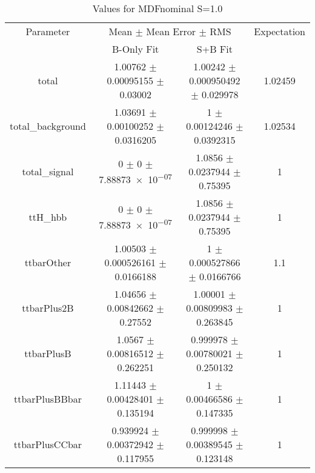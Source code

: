 \begin{table}
\centering
\caption{Values for MDFnominal S=1.0}
\begin{tabular}{cccc}
\toprule
Parameter & \multicolumn{2}{c}{Mean $\pm$ Mean Error $\pm$ RMS} & Expectation\\
 & B-Only Fit & S+B Fit & \\
\midrule
total & \num{1.00762} $\pm$ \num{0.00095155} $\pm$ \num{0.03002} & \num{1.00242} $\pm$ \num{0.000950492} $\pm$ \num{0.029978} & \num{1.02459}\\
total\_background & \num{1.03691} $\pm$ \num{0.00100252} $\pm$ \num{0.0316205} & \num{1} $\pm$ \num{0.00124246} $\pm$ \num{0.0392315} & \num{1.02534}\\
total\_signal & \num{0} $\pm$ \num{0} $\pm$ \num{7.88873e-07} & \num{1.0856} $\pm$ \num{0.0237944} $\pm$ \num{0.75395} & \num{1}\\
ttH\_hbb & \num{0} $\pm$ \num{0} $\pm$ \num{7.88873e-07} & \num{1.0856} $\pm$ \num{0.0237944} $\pm$ \num{0.75395} & \num{1}\\
ttbarOther & \num{1.00503} $\pm$ \num{0.000526161} $\pm$ \num{0.0166188} & \num{1} $\pm$ \num{0.000527866} $\pm$ \num{0.0166766} & \num{1.1}\\
ttbarPlus2B & \num{1.04656} $\pm$ \num{0.00842662} $\pm$ \num{0.27552} & \num{1.00001} $\pm$ \num{0.00809983} $\pm$ \num{0.263845} & \num{1}\\
ttbarPlusB & \num{1.0567} $\pm$ \num{0.00816512} $\pm$ \num{0.262251} & \num{0.999978} $\pm$ \num{0.00780021} $\pm$ \num{0.250132} & \num{1}\\
ttbarPlusBBbar & \num{1.11443} $\pm$ \num{0.00428401} $\pm$ \num{0.135194} & \num{1} $\pm$ \num{0.00466586} $\pm$ \num{0.147335} & \num{1}\\
ttbarPlusCCbar & \num{0.939924} $\pm$ \num{0.00372942} $\pm$ \num{0.117955} & \num{0.999998} $\pm$ \num{0.00389545} $\pm$ \num{0.123148} & \num{1}\\
\bottomrule
\end{tabular}
\end{table}